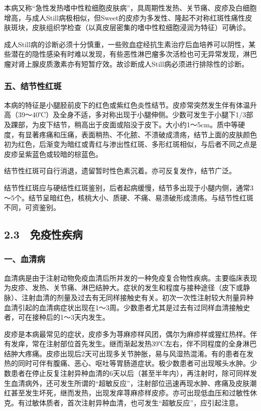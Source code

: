 本病又称“急性发热嗜中性粒细胞皮肤病”，具周期性发热、关节痛、皮疹及白细胞增高，与成人Still病极相似，但Sweet的皮疹为多发性、隆起不对称红斑性痛性皮肤斑块，皮肤组织学检查（以真皮层密集的嗜中性粒细胞浸润为特征）可确诊。

成人Still病的诊断必须十分慎重，一些败血症经抗生素治疗后血培养可以阴性，某些潜在的隐性感染有时难以发现，有些恶性淋巴瘤多次活检也可无异常发现，淋巴瘤对肾上腺皮质激素亦有短暂疗效。故诊断成人Still病必须进行排除性的诊断。

\subsubsection{五、结节性红斑}

本病的特征是小腿胫前皮下的红色或紫红色炎性结节。皮疹常突然发生伴有体温升高（39～40℃）及全身不适，多对称出现于小腿伸侧。少数可发生于小腿下1/3部及踝部，为皮下结节，稍高出于皮面或陷没于皮下。大小约1～5cm。质中等硬度，有显著疼痛和压痛，表面稍热、不化脓、不溃破成溃疡，结节上面的皮肤颜色初为红色，后渐变为暗红或青红与渗出性红斑、多形红斑相似，与后者不同之点是皮疹呈紫蓝色或较暗的棕蓝色。

结节性红斑可自行消退，遗留暂时性色素沉着。亦可反复发作，结节广泛。

结节性红斑应与硬结性红斑鉴别，后者起病缓慢，结节多出现于小腿内侧，通常3～5个。结节呈暗红色，核桃大小、质硬、不痛、易溃破形成溃疡。与结节性红斑不同，可资鉴别。

\protect\hypertarget{text00023.html}{}{}

\subsection{2.3　免疫性疾病}

\subsubsection{一、血清病}

血清病是由于注射动物免疫血清后所并发的一种免疫复合物性疾病。主要临床表现为皮疹、发热、关节痛、淋巴结肿大。症状的发生和程度与接种途径（皮下或静脉）、注射血清的剂量及过去有无同样接触史有关。初次一次性注射较大剂量异种血清引起的血清病症状出现在1～3周。少数患者尤其是过去有过同样血清接触史者，可在接种后的1～3天内发生。

皮疹是本病最常见的症状，皮疹多为荨麻疹样风团，偶尔为麻疹样或猩红热样。伴有发痒，常在注射部位首先发生。继而渐起发热39℃左右，伴不同程度的全身淋巴结肿大疼痛。皮疹出现后2天可出现多关节肿胀，易与风湿热混淆。有的患者在发热的同时可伴有腹痛、恶心、呕吐等胃肠道症状。极少数患者可出现喉头水肿。少数患者在停止反复注射异种血清的6天以后（甚至半年内），再注射时，除可同样发生血清病外，还可发生所谓的“超敏反应”，注射部位迅速再现水肿、疼痛及皮肤潮红甚至发生坏死，继而发热，出现发痒荨麻疹样皮疹。亦可出现低血压和过敏性休克。有过敏体质者，首次注射异种血清，也可发生“超敏反应”，应引起注意。

